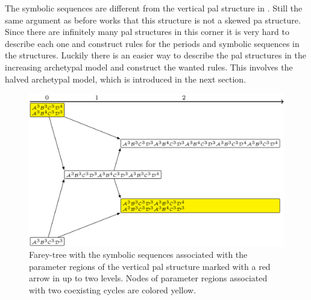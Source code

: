 The symbolic sequences are different from the vertical \gls{pal} structure in .
Still the same argument as before works that this structure is not a skewed \gls{pa} structure.
Since there are infinitely many \gls{pal} structures in this corner it is very hard to describe each one and construct rules for the periods and symbolic sequences in the structures.
Luckily there is an easier way to describe the \gls{pal} structures in the increasing archetypal model and construct the wanted rules.
This involves the halved archetypal model, which is introduced in the next section.

\begin{figure}
	\centering
	\includegraphics[width=.7 \textwidth]{../Figures/7/7.15+17/adding.png}
	\caption[Farey-tree with the symbolic sequences of a vertical  structure]{
		Farey-tree with the symbolic sequences associated with the parameter regions of the vertical \gls{pal} structure marked with a red arrow in  up to two levels.
		Nodes of parameter regions associated with two coexisting cycles are colored yellow.
	}
	\label{fig:add.add.like.corn.vert.tree}
\end{figure}
